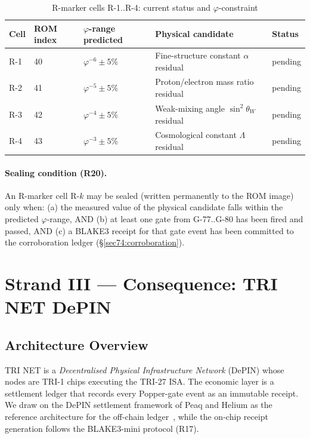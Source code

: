 \begin{table}[H]
\centering
\caption{R-marker cells R-1..R-4: current status and $\varphi$-constraint}
\label{tab74:r-markers}
\small
\begin{tabular}{lllll}
\toprule
Cell & ROM index & $\varphi$-range predicted & Physical candidate & Status \\
\midrule
R-1 & 40 & $\varphi^{-6} \pm 5\%$ & Fine-structure constant $\alpha$ residual & pending \\
R-2 & 41 & $\varphi^{-5} \pm 5\%$ & Proton/electron mass ratio residual       & pending \\
R-3 & 42 & $\varphi^{-4} \pm 5\%$ & Weak-mixing angle $\sin^{2}\theta_{W}$ residual & pending \\
R-4 & 43 & $\varphi^{-3} \pm 5\%$ & Cosmological constant $\Lambda$ residual  & pending \\
\bottomrule
\end{tabular}
\end{table}

\paragraph{Sealing condition (R20).}
An R-marker cell R-$k$ may be sealed (written permanently to the ROM
image) only when: (a) the measured value of the physical candidate falls
within the predicted $\varphi$-range, AND (b) at least one gate from
G-77..G-80 has been fired and passed, AND (c) a BLAKE3 receipt for that
gate event has been committed to the corroboration ledger
(\S\ref{sec74:corroboration}).

\section{Strand III — Consequence: TRI NET DePIN}
\label{sec74:strand-iii}

\subsection{Architecture Overview}
\label{sec74:depin-arch}

TRI NET is a \emph{Decentralised Physical Infrastructure Network}
(DePIN) whose nodes are TRI-1 chips executing the TRI-27 ISA.  The
economic layer is a settlement ledger that records every Popper-gate
event as an immutable receipt.  We draw on the DePIN settlement
framework of Peaq and Helium as the reference architecture for the
off-chain ledger~\cite{peaq2023depin}, while the on-chip receipt
generation follows the BLAKE3-mini protocol (R17).

